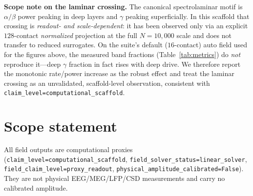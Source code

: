 \documentclass[11pt]{article}
\begin{document}
\textbf{Scope note on the laminar crossing.} The canonical spectrolaminar motif is
$\alpha/\beta$ power peaking in deep layers and $\gamma$ peaking superficially. In this
scaffold that crossing is \emph{readout- and scale-dependent}: it has been observed only via
an explicit $128$-contact \emph{normalized} projection at the full $N=10{,}000$ scale and does
not transfer to reduced surrogates. On the suite's default ($16$-contact) auto field used for
the figures above, the measured band fractions (Table~\ref{tab:metrics}) do \emph{not} reproduce
it---deep $\gamma$ fraction in fact rises with deep drive. We therefore report the monotonic
rate/power increase as the robust effect and treat the laminar crossing as an unvalidated,
scaffold-level observation, consistent with \texttt{claim\_level=computational\_scaffold}.

\section*{Scope statement}
All field outputs are computational proxies
(\texttt{claim\_level=computational\_scaffold}, \texttt{field\_solver\_status=linear\_solver},
\texttt{field\_claim\_level=proxy\_readout}, \texttt{physical\_amplitude\_calibrated=False}).
They are not physical EEG/MEG/LFP/CSD measurements and carry no calibrated amplitude.
\end{document}
